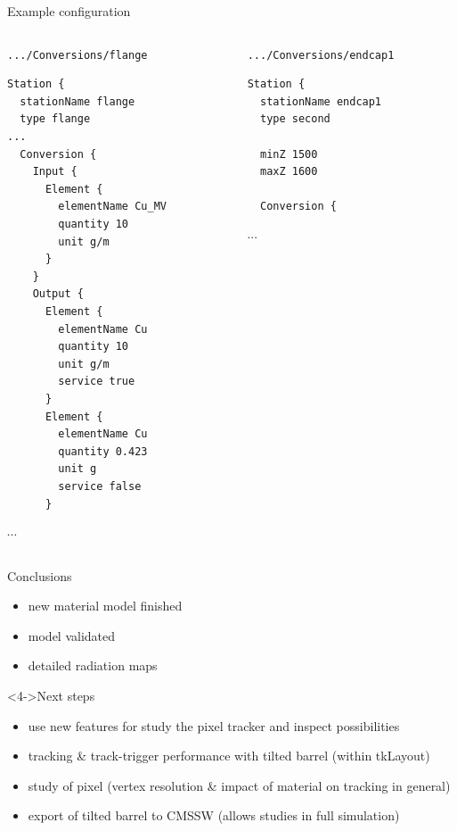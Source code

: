 \documentclass[pdftex, 11pt]{beamer}
\newcommand{\pat}[1]{\texttt{#1}}
\begin{document}
\begin{frame}[fragile]{Example configuration}
  \tiny
  \begin{columns}[t]
    \begin{column}{0.47\textwidth}
      \begin{block}{\pat{.../Conversions/flange}}
\begin{verbatim}
Station {
  stationName flange
  type flange
...
  Conversion {
    Input {
      Element {
        elementName Cu_MV
        quantity 10
        unit g/m
      }
    }
    Output {
      Element {
        elementName Cu
        quantity 10
        unit g/m
        service true
      }
      Element {
        elementName Cu
        quantity 0.423
        unit g
        service false
      }
\end{verbatim}
$\cdots$
      \end{block}
    \end{column}
    \begin{column}{0.47\textwidth}
      \begin{block}{\pat{.../Conversions/endcap1}}
\begin{verbatim}
Station {
  stationName endcap1
  type second

  minZ 1500
  maxZ 1600

  Conversion {
\end{verbatim}
$\cdots$
      \end{block}
    \end{column}
  \end{columns}
\end{frame}

\begin{frame}
  \begin{block}{Conclusions}
    \begin{itemize}
    \item new material model \alert{finished}
    \item<2-> model validated
    \item<3-> detailed \alert{radiation maps}
    \end{itemize}    
  \end{block}
  \begin{block}<4->{Next steps}
    \begin{itemize}
    \item<4-> use new features for study the \alert{pixel} tracker and
      \alert{inspect} possibilities
    \item<5-> tracking \& track-trigger performance with \alert{tilted} barrel (within tkLayout) 
    \item<6-> study of \alert{pixel} (vertex resolution \& impact of material on tracking in general)
    \item<7-> \alert{export} of tilted barrel to CMSSW (allows studies in full simulation)
    \end{itemize}
  \end{block}
\end{frame}
\end{document}
